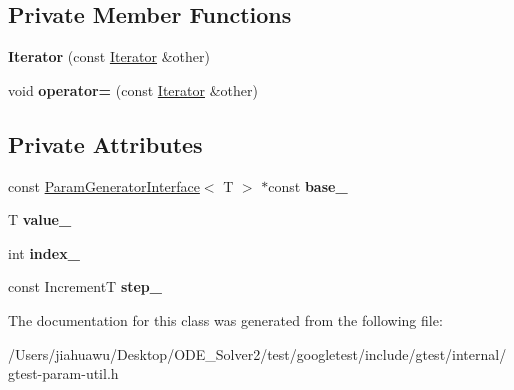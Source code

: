 \subsection*{Private Member Functions}
\begin{DoxyCompactItemize}
\item 
\mbox{\label{classtesting_1_1internal_1_1_range_generator_1_1_iterator_a14150df56c79ae26f1beaea1e7548ebc}} 
{\bfseries Iterator} (const \mbox{\hyperlink{classtesting_1_1internal_1_1_range_generator_1_1_iterator}{Iterator}} \&other)
\item 
\mbox{\label{classtesting_1_1internal_1_1_range_generator_1_1_iterator_acd95aafca4a92db473dd4a88bbc9ab1b}} 
void {\bfseries operator=} (const \mbox{\hyperlink{classtesting_1_1internal_1_1_range_generator_1_1_iterator}{Iterator}} \&other)
\end{DoxyCompactItemize}
\subsection*{Private Attributes}
\begin{DoxyCompactItemize}
\item 
\mbox{\label{classtesting_1_1internal_1_1_range_generator_1_1_iterator_aa6767ad52e3cbd87c457fb5b8b6a21d9}} 
const \mbox{\hyperlink{classtesting_1_1internal_1_1_param_generator_interface}{Param\+Generator\+Interface}}$<$ T $>$ $\ast$const {\bfseries base\+\_\+}
\item 
\mbox{\label{classtesting_1_1internal_1_1_range_generator_1_1_iterator_aab59a7070669d64348494a1fb1795934}} 
T {\bfseries value\+\_\+}
\item 
\mbox{\label{classtesting_1_1internal_1_1_range_generator_1_1_iterator_a2e9064f8da43367550e82eea8adabc2c}} 
int {\bfseries index\+\_\+}
\item 
\mbox{\label{classtesting_1_1internal_1_1_range_generator_1_1_iterator_a18ebb51d061695f102c2ef74cade8618}} 
const IncrementT {\bfseries step\+\_\+}
\end{DoxyCompactItemize}


The documentation for this class was generated from the following file\+:\begin{DoxyCompactItemize}
\item 
/\+Users/jiahuawu/\+Desktop/\+O\+D\+E\+\_\+\+Solver2/test/googletest/include/gtest/internal/gtest-\/param-\/util.\+h\end{DoxyCompactItemize}

